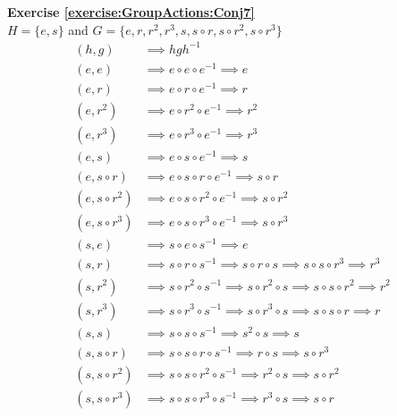 \noindent\textbf{Exercise \ref{exercise:GroupActions:Conj7}}
\\
$H = \{e, s\}$ and $G = \{e, r, r^2, r^3, s, s \circ r, s \circ r^2, s \circ r^3\}$
\begin{align*}
(h, g) &\implies hgh^{-1}
\\
(e, e) &\implies e \circ e \circ e^{-1} \implies e
\\
(e, r) &\implies e \circ r \circ e^{-1} \implies r
\\
(e, r^2) &\implies e \circ r^2 \circ e^{-1} \implies r^2
\\
(e, r^3) &\implies e \circ r^3 \circ e^{-1} \implies r^3
\\
(e, s) &\implies e \circ s \circ e^{-1} \implies s
\\
(e, s \circ r) &\implies e \circ s \circ r \circ e^{-1} \implies s \circ r
\\
(e, s \circ r^2) &\implies e \circ s \circ r^2 \circ e^{-1} \implies s \circ r^2
\\
(e, s \circ r^3) &\implies e \circ s \circ r^3 \circ e^{-1} \implies s \circ r^3
\\
(s, e) &\implies s \circ e \circ s^{-1} \implies e
\\
(s, r) &\implies s \circ r \circ s^{-1} \implies s \circ r \circ s \implies s \circ s \circ r^3 \implies r^3
\\
(s, r^2) &\implies s \circ r^2 \circ s^{-1} \implies s \circ r^2 \circ s \implies s \circ s \circ r^2 \implies r^2
\\
(s, r^3) &\implies s \circ r^3 \circ s^{-1} \implies s \circ r^3 \circ s \implies s \circ s \circ r \implies r
\\
(s, s) &\implies s \circ s \circ s^{-1} \implies s^2 \circ s \implies s
\\
(s, s \circ r) &\implies s \circ s \circ r \circ s^{-1} \implies r \circ s \implies s \circ r^3
\\
(s, s \circ r^2) &\implies s \circ s \circ r^2 \circ s^{-1} \implies r^2 \circ s \implies s \circ r^2
\\
(s, s \circ r^3) &\implies s \circ s \circ r^3 \circ s^{-1} \implies r^3 \circ s \implies s \circ r
\end{align*}


